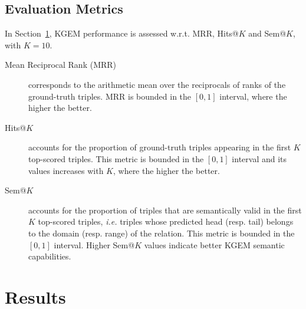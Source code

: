 \documentclass[letterpaper]{article} %
\begin{document}
\subsection{Evaluation Metrics}
In Section~\ref{results}, KGEM performance is assessed w.r.t. MRR, Hits@$K$ and Sem@$K$, with $K=10$.

\begin{description}
\item [Mean Reciprocal Rank (MRR)] corresponds to the arithmetic mean over the reciprocals of ranks of the ground-truth triples.
MRR is bounded in the $\left[0,1\right]$ interval, where the higher the better.
\item [Hits@$K$] accounts for the proportion of ground-truth triples appearing in the first $K$ top-scored triples.
This metric is bounded in the $ \left[0,1\right]$ interval and its values increases with $K$, where the higher the better.
\item [Sem@$K$~\cite{dl4kg,hubert2023}] accounts for the proportion of
triples that are semantically valid in the first $K$ top-scored triples, \textit{i.e.} triples whose predicted head (resp. tail) belongs to the domain (resp. range) of the relation. This metric is bounded in the $ \left[0,1\right]$ interval. Higher Sem@$K$ values indicate better KGEM semantic capabilities.
\end{description}

\section{Results}\label{results}
\end{document}
